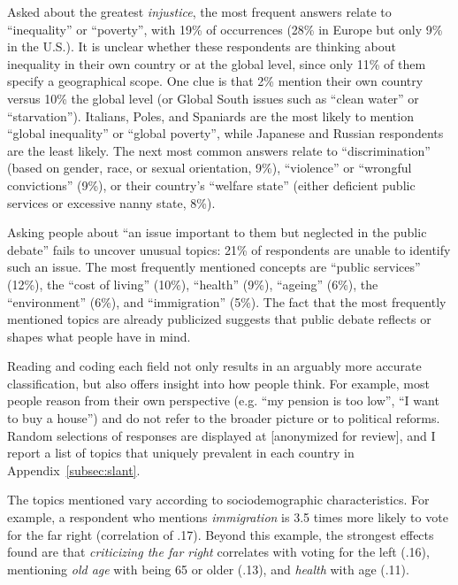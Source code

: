\documentclass[12pt,english]{article}
\begin{document}
\begin{bibunit}
Asked about the greatest \textit{injustice}, the most frequent answers relate to ``inequality'' or ``poverty'', with 19\% of occurrences (28\% in Europe but only 9\% in the U.S.). It is unclear whether these respondents are thinking about inequality in their own country or at the global level, since only 11\% of them specify a geographical scope. One clue is that 2\% mention their own country versus 10\% the global level (or Global South issues such as ``clean water'' or ``starvation''). Italians, Poles, and Spaniards are the most likely to mention ``global inequality'' or ``global poverty'', while Japanese and Russian respondents are the least likely.
The next most common answers relate to ``discrimination'' (based on gender, race, or sexual orientation, 9\%), ``violence'' or ``wrongful convictions'' (9\%), or their country's ``welfare state'' (either deficient public services or excessive nanny state, 8\%). 

Asking people about ``an issue important to them but neglected in the public debate'' fails to uncover unusual topics: 21\% of respondents are unable to identify such an issue. The most frequently mentioned concepts are ``public services'' (12\%), the ``cost of living'' (10\%), ``health'' (9\%), ``ageing'' (6\%), the ``environment'' (6\%), and ``immigration'' (5\%). The fact that the most frequently mentioned topics are already publicized suggests that public debate reflects or shapes what people have in mind.

Reading and coding each field not only results in an arguably more accurate classification, but also offers insight into how people think. For example, most people reason from their own perspective (e.g. ``my pension is too low'', ``I want to buy a house'') and do not refer to the broader picture or to political reforms. %
Random selections of responses are displayed at [anonymized for review], %
and %
 I report a list of topics that uniquely prevalent in each country in Appendix~\ref{subsec:slant}. 

The topics mentioned vary according to sociodemographic characteristics. For example, a respondent who mentions \textit{immigration} is 3.5 times more likely to vote for the far right (correlation of .17). %
Beyond this example, the strongest effects found are that \textit{criticizing the far right} correlates with voting for the left (.16), mentioning \textit{old age} with being 65 or older (.13), and \textit{health} with age (.11).


\end{bibunit}
\end{document}
